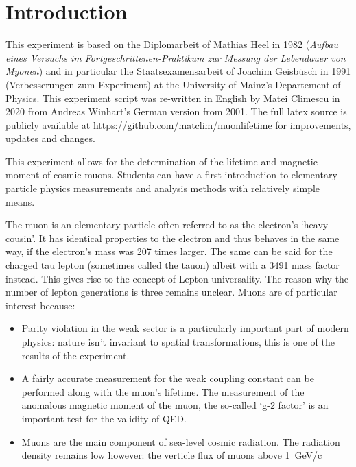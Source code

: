 
\chapter{Introduction}

This experiment is based on the Diplomarbeit of Mathias Heel in 1982 (\textit{Aufbau eines Versuchs im Fortgeschrittenen-Praktikum zur Messung der Lebendauer von Myonen}) and in particular the Staatsexamensarbeit of Joachim Geisb\"{u}sch in 1991 (Verbesserungen zum Experiment) at the University of Mainz's Departement of Physics. This experiment script was re-written in English by Matei Climescu in 2020 from Andreas Winhart's German version from 2001. The full latex source is publicly available at \href{https://github.com/matclim/muonlifetime}{https://github.com/matclim/muonlifetime} for improvements, updates and changes.



This experiment allows for the determination of the lifetime and magnetic moment of cosmic muons. Students can have a first introduction to elementary particle physics measurements and analysis methods with relatively simple means. 


The muon \Pmuon is an elementary particle often referred to as the electron's `heavy cousin'. It has identical properties to the electron and thus behaves in the same way, if the electron's mass was 207 times larger. The same can be said for the charged tau lepton \Ptauon (sometimes called the tauon) albeit with a 3491 mass factor instead. This gives rise to the concept of Lepton universality. The reason why the number of lepton generations is three remains unclear. Muons are of particular interest because:


\begin{itemize}
\item Parity violation in the weak sector is a particularly important part of modern physics: nature isn't invariant to spatial transformations, this is one of the results of the experiment.

\item A fairly accurate measurement for the weak coupling constant can be performed along with the muon's lifetime. The measurement of the anomalous magnetic moment of the muon, the so-called `g-2 factor' is an important test for the validity of QED.

\item Muons are the main component of sea-level cosmic radiation. The radiation density remains low however: the verticle flux of muons above \SI{1}{GeV/c}
\end{itemize}

